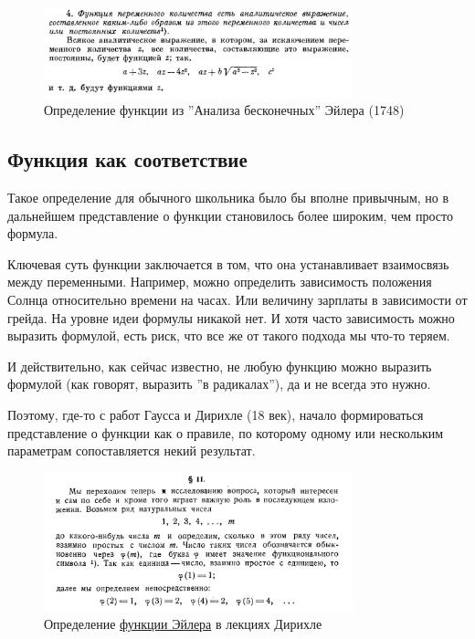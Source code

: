 \documentclass[a4paper,12pt]{article}
\newcounter{th-counter}
\begin{document}
\begin{figure}[h] %
    \centering
    \includegraphics[width=0.8\textwidth]{pictures/eulers_function_def.jpg}
    \caption{Определение функции из ''Анализа бесконечных'' Эйлера (1748) \cite{EulerInfiniteV1}}
\end{figure}

\subsection*{Функция как соответствие}

Такое определение для обычного школьника было бы вполне привычным, но в дальнейшем представление о функции становилось более широким, чем просто формула.

Ключевая суть функции заключается в том, что она устанавливает взаимосвязь между переменными. Например, можно определить зависимость положения Солнца относительно времени на часах. Или величину зарплаты в зависимости от грейда. На уровне идеи формулы никакой нет. И хотя часто зависимость можно выразить формулой, есть риск, что все же от такого подхода мы что-то теряем.

И действительно, как сейчас известно, не любую функцию можно выразить формулой (как говорят, выразить ''в радикалах''), да и не всегда это нужно.

Поэтому, где-то с работ Гаусса и Дирихле (18 век), начало формироваться представление о функции как о правиле, по которому одному или нескольким параметрам сопоставляется некий результат.

\begin{figure}[h] %
    \centering
    \includegraphics[width=0.8\textwidth]{pictures/euler_function_by_dirichlet.jpg}
    \caption{Определение \href{https://w.wiki/EsaF}{функции Эйлера} в лекциях Дирихле \cite{DirichletNumberTheoryLectures}}
\end{figure}
\end{document}
